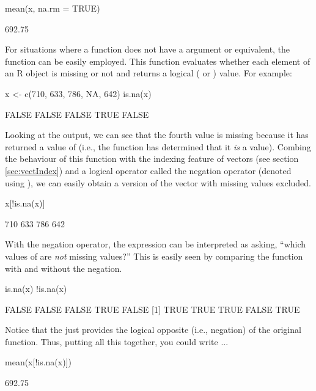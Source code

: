 \begin{inR}
mean(x, na.rm = TRUE)
\end{inR}
\begin{outR}
[1] 692.75
\end{outR}

For situations where a function does not have a  argument or equivalent, the function  can be easily employed. This function evaluates whether each element of an R object is missing or not and returns a logical ( or ) value. For example:

\begin{inR}
x <- c(710, 633, 786, NA, 642)
is.na(x)
\end{inR}
\begin{outR}
[1] FALSE FALSE FALSE TRUE FALSE
\end{outR}

Looking at the output, we can see that the fourth value is missing because it has returned a value of  (i.e., the function has determined that it \textit{is} a  value).  Combing the behaviour of this function with the indexing feature of vectors (see section \ref{sec:vectIndex}) and a \gls{logical operator} called the \gls{negation operator} (denoted using \R{!}), we can easily obtain a version of the vector with missing values excluded.

\begin{inR}
x[!is.na(x)]
\end{inR}
\begin{outR}
[1] 710 633 786 642
\end{outR}

With the negation operator, the expression  can be interpreted as asking, ``which values of  are \textit{not} missing values?''  This is easily seen by comparing the  function with and without the negation.

\begin{inR}
is.na(x)
!is.na(x)
\end{inR}
\begin{outR}
[1] FALSE FALSE FALSE  TRUE FALSE
[1]  TRUE  TRUE  TRUE FALSE  TRUE
\end{outR}

Notice that the \R{!} just provides the logical opposite (i.e., negation) of the original function.  Thus, putting all this together, you could write ...

\begin{inR}
mean(x[!is.na(x)])
\end{inR}
\begin{outR}
[1] 692.75
\end{outR}

